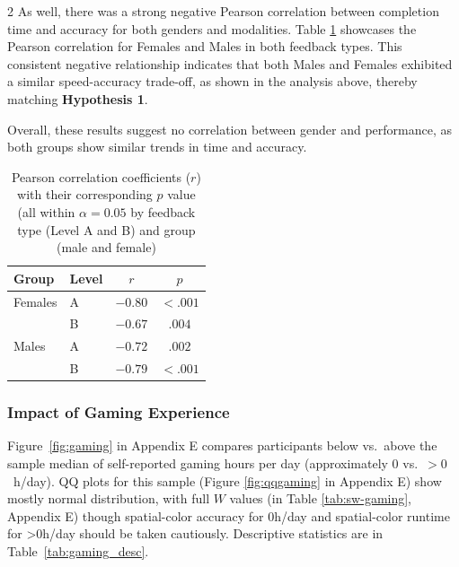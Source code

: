 \documentclass[a4paper,12pt]{article}
\begin{document}
\begin{multicols}{2}
As well, there was a strong negative Pearson correlation between completion time and accuracy for both genders and modalities. Table \ref{tab:correlation_results} showcases the Pearson correlation for  Females and Males in both feedback types. This consistent negative relationship indicates that both Males and Females exhibited a similar speed-accuracy trade-off, as shown in the analysis above, thereby matching \textbf{Hypothesis 1}. 

Overall, these results suggest no correlation between gender and performance, as both groups show similar trends in time and accuracy. 
\vspace{-10pt}

\begin{table}[H]
\centering
\small 
\setlength{\tabcolsep}{6pt} %
\caption{Pearson correlation coefficients ($r$) with their corresponding $p$ value (all within $\alpha = 0.05$ by feedback type (Level A and B) and group (male and female)}
\label{tab:correlation_results}
\begin{tabularx}{\columnwidth}{@{}XXcc@{}}
    \toprule
    Group & Level & $r$ & $p$ \\
    \midrule
    Females & A      & $-0.80$ & $<.001$ \\
                  & B & $-0.67$ & $.004$ \\
    Males   & A     & $-0.72$ & $.002$ \\
                  & B & $-0.79$ & $<.001$ \\
    \bottomrule
  \end{tabularx}
\end{table}

\subsubsection{Impact of Gaming Experience}
Figure~\ref{fig:gaming} in Appendix E compares participants below vs.\ above the sample median of self-reported gaming hours per day (approximately 0 vs.\ $>0$~h/day). QQ plots for this sample (Figure \ref{fig:qqgaming} in Appendix E) show mostly normal distribution, with full $W$ values (in Table \ref{tab:sw-gaming}, Appendix E) though spatial-color accuracy for 0h/day and spatial-color runtime for >0h/day should be taken cautiously. Descriptive statistics are in Table~\ref{tab:gaming_desc}.


\end{multicols}
\end{document}
